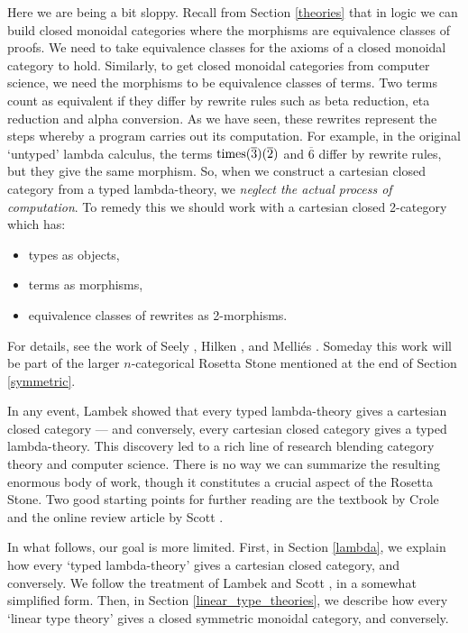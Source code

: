 \documentclass[12pt,twoside,openright]{report}
\newcommand{\Times}{{\rm times}}
\begin{document}
Here we are being a bit sloppy.  Recall from Section \ref{theories}
that in logic we can build closed monoidal categories where the morphisms are equivalence classes of proofs.  We need to take equivalence classes for the axioms of a closed monoidal category to hold.  Similarly, to get closed monoidal categories from computer science, we need the morphisms to be equivalence classes of terms. Two terms count as equivalent if they differ by rewrite rules such as beta reduction, eta reduction and alpha conversion.  As we have seen, these rewrites represent the steps whereby a program carries out its computation.  For example, in the original `untyped' lambda calculus, the terms $\Times(\overline{3})(\overline{2})$ and $\overline{6}$
differ by rewrite rules, but they give the same morphism.  So, when we construct a cartesian closed category from a typed lambda-theory, we
{\it neglect the actual process of computation}.  To remedy this we should work with a cartesian closed 2-category which has:
\begin{itemize}
\item types as objects,
\item terms as morphisms,
\item equivalence classes of rewrites as 2-morphisms.
\end{itemize}
For details, see the work of Seely \cite{Seely}, Hilken \cite{Hilken}, and Melli\'es \cite{Mellies}.  Someday this work will be part of the larger $n$-categorical Rosetta Stone mentioned at the end of Section
\ref{symmetric}.

In any event, Lambek showed that every typed lambda-theory gives a cartesian closed category --- and conversely, every cartesian closed category gives a typed lambda-theory.  This discovery led to a rich line of research blending category theory and computer science.  There is no way we can summarize the resulting enormous body of work, though it constitutes a crucial aspect of the Rosetta Stone.  Two good starting points for further reading are the textbook by Crole
\cite{Crole} and the online review article by Scott \cite{Scott}.

In what follows, our goal is more limited.  First, in Section
\ref{lambda}, we explain how every `typed lambda-theory' gives a cartesian closed category, and conversely.  We follow the treatment of Lambek and Scott \cite{LS}, in a somewhat simplified form.  Then, in Section \ref{linear_type_theories}, we describe how every `linear type theory' gives a closed symmetric monoidal category, and conversely.
\end{document}
